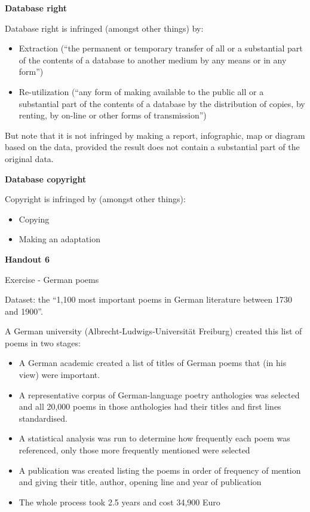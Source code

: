 \documentclass{article}
\begin{document}
\textbf{Database right}

Database right is infringed (amongst other things) by:

\begin{itemize}
\item
  Extraction (``the permanent or temporary transfer of all or a
  substantial part of the contents of a database to another medium by
  any means or in any form'')
\item
  Re-utilization (``any form of making available to the public all or a
  substantial part of the contents of a database by the distribution of
  copies, by renting, by on-line or other forms of transmission'')
\end{itemize}

But note that it is not infringed by making a report, infographic, map
or diagram based on the data, provided the result does not contain a
substantial part of the original data.

\textbf{Database copyright}

Copyright is infringed by (amongst other things):

\begin{itemize}
\item
  Copying
\item
  Making an adaptation
\end{itemize}

\textbf{Handout 6}

Exercise - German poems

Dataset: the ``1,100 most important poems in German literature between
1730 and 1900''.

A German university (Albrecht-Ludwigs-Universität Freiburg) created this
list of poems in two stages:

\begin{itemize}
\item
  A German academic created a list of titles of German poems that (in
  his view) were important.
\item
  A representative corpus of German-language poetry anthologies was
  selected and all 20,000 poems in those anthologies had their titles
  and first lines standardised.
\item
  A statistical analysis was run to determine how frequently each poem
  was referenced, only those more frequently mentioned were selected
\item
  A publication was created listing the poems in order of frequency of
  mention and giving their title, author, opening line and year of
  publication
\item
  The whole process took 2.5 years and cost 34,900 Euro
\end{itemize}
\end{document}
